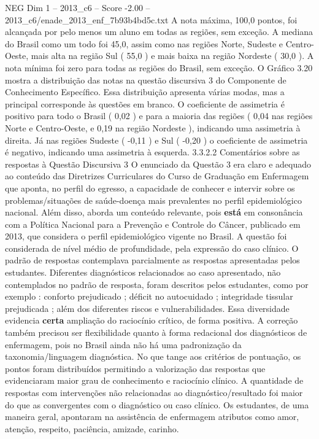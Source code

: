 \begin{textsample}{NEG Dim 1 – 2013\_c6 – Score -2.00 – 2013\_c6/enade\_2013\_enf\_7b93b4bd5c.txt}
A nota máxima, 100,0 pontos, foi alcançada por pelo menos um aluno em todas as regiões, sem exceção.
A mediana do Brasil como um todo foi 45,0, assim como nas regiões Norte, Sudeste e Centro-Oeste, mais alta na região Sul ( 55,0 ) e mais baixa na região Nordeste ( 30,0 ).
A nota mínima foi zero para todas as regiões do Brasil, sem exceção.
O Gráfico 3.20 mostra a distribuição das notas na questão discursiva 3 do Componente de Conhecimento Específico.
Essa distribuição apresenta várias modas, mas a principal corresponde às questões em branco.
O coeficiente de assimetria é positivo para todo o Brasil ( 0,02 ) e para a maioria das regiões ( 0,04 nas regiões Norte e Centro-Oeste, e 0,19 na região Nordeste ), indicando uma assimetria à direita.
Já nas regiões Sudeste ( -0,11 ) e Sul ( -0,20 ) o coeficiente de assimetria é negativo, indicando uma assimetria à esquerda. 3.3.2.2 Comentários sobre as respostas à Questão Discursiva 3 O enunciado da Questão 3 era claro e adequado ao conteúdo das Diretrizes Curriculares do Curso de Graduação em Enfermagem que aponta, no perfil do egresso, a capacidade de conhecer e intervir sobre os problemas/situações de saúde-doença mais prevalentes no perfil epidemiológico nacional.
Além disso, aborda um conteúdo relevante, pois \textbf{está} em consonância com a Política Nacional para a Prevenção e Controle do Câncer, publicado em 2013, que considera o perfil epidemiológico vigente no Brasil.
A questão foi considerada de nível médio de profundidade, pela expressão do caso clínico.
O padrão de respostas contemplava parcialmente as respostas apresentadas pelos estudantes.
Diferentes diagnósticos relacionados ao caso apresentado, não contemplados no padrão de resposta, foram descritos pelos estudantes, como por exemplo : conforto prejudicado ; déficit no autocuidado ; integridade tissular prejudicada ; além dos diferentes riscos e vulnerabilidades.
Essa diversidade evidencia \textbf{certa} ampliação do raciocínio crítico, de forma positiva.
A correção também precisou ser flexibilidade quanto à forma redacional dos diagnósticos de enfermagem, pois no Brasil ainda não há uma padronização da taxonomia/linguagem diagnóstica.
No que tange aos critérios de pontuação, os pontos foram distribuídos permitindo a valorização das respostas que evidenciaram maior grau de conhecimento e raciocínio clínico.
A quantidade de respostas com intervenções não relacionadas ao diagnóstico/resultado foi maior do que as convergentes com o diagnóstico ou caso clínico.
Os estudantes, de uma maneira geral, apontaram na assistência de enfermagem atributos como amor, atenção, respeito, paciência, amizade, carinho.

\end{textsample}
